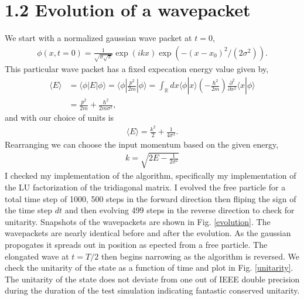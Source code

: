 \documentclass[singlepage,notitlepage,nofootinbib,11pt]{revtex4-1}
\newcommand{\eq}[1]{\begin{align*}#1\end{align*}}
\def\<{\langle}
\def\>{\rangle}
\begin{document}
\section*{1.2 Evolution of a wavepacket}
We start with a normalized gaussian wave packet at $t=0$,
\eq{
\phi(x,t=0) = \frac{1}{\sqrt{\sigma \sqrt{\pi}}}\exp\left(ikx\right)\exp\left(-(x-x_0)^2/\left(2\sigma^2\right)\right).
}
This particular wave packet has a fixed expecation energy value given by,
\begin{align*}
  \<E\> &= \<\phi|E|\phi\> = \<\phi|\frac{p^2}{2m}|\phi\> = \int_{\mathbb{R}}dx\<\phi|x\>\left(-\frac{\hbar^2}{2m}\right)\frac{\partial^2}{\partial x^2}\<x|\phi\> \\
  &= \frac{p^2}{2m} + \frac{\hbar^2}{2 m \sigma^2},
\end{align*}
and with our choice of units is
\eq{
\<E\> = \frac{k^2}{2} +  \frac{1}{4\sigma^2}.
}
Rearranging we can choose the input momentum based on the given energy,
\eq{
k = \sqrt{2 E - \frac{1}{2\sigma^2}}
  }
I checked my implementation of the algorithm, specifically my implementation of the LU factorization of the tridiagonal matrix. I evolved the free particle for a total time step of 1000, 500 steps in the forward direction then fliping the sign of the time step $dt$ and then evolving 499 steps in the reverse direction to check for unitarity. Snapshots of the wavepackets are shown in Fig. \ref{evolution}. The wavepackets are nearly identical before and after the evolution. As the gaussian propogates it spreads out in position as epected from a free particle. The elongated wave at $t=T/2$ then begins narrowing as the algorithm is reversed. We check the unitarity of the state as a function of time and plot in Fig. \ref{unitarity}. The unitarity of the state does not deviate from one out of IEEE double precision during the duration of the test simulation indicating fantastic conserved unitarity.
\end{document}
